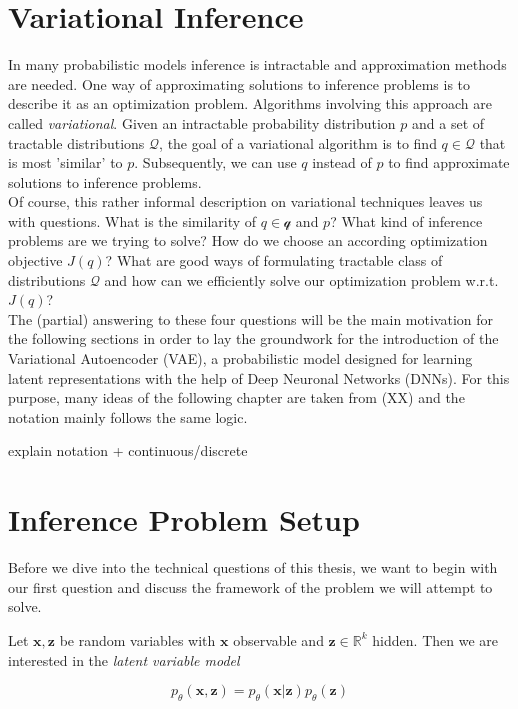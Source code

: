 


\section{Variational Inference}

In many probabilistic models inference is intractable and approximation methods are needed. One way of approximating solutions to inference problems is to describe it as an optimization problem. Algorithms involving this approach are called \emph{variational}.
Given an intractable probability distribution $p$ and a set of tractable distributions $\mathcal{Q}$, the goal of a variational algorithm is to find $q \in \mathcal{Q}$ that is most 'similar' to $p$. Subsequently, we can use $q$ instead of $p$ to find approximate solutions to inference problems.\\
Of course, this rather informal description on variational techniques leaves us with questions. What is the similarity of $q \in \mathcal{q}$ and $p$? What kind of inference problems are we trying to solve? How do we choose an according optimization objective $J(q)$? What are good ways of formulating tractable class of distributions $\mathcal{Q}$ and how can we efficiently solve our optimization problem w.r.t. $J(q)$? \\
The (partial) answering to these four questions will be the main motivation for the following sections in order to lay the groundwork for the introduction of the Variational Autoencoder (VAE), a probabilistic model designed for learning latent representations with the help of Deep Neuronal Networks (DNNs). For this purpose, many ideas of the following chapter are taken from (XX) and the notation mainly follows the same logic. %

explain notation + continuous/discrete

\section{Inference Problem Setup}
Before we dive into the technical questions of this thesis, we want to begin with our first question and discuss the framework of the problem we will attempt to solve. 

Let $\mathbf{x}, \mathbf{z}$ be random variables with $\mathbf{x}$ observable and $\mathbf{z} \in \mathbb{R}^k$ hidden. Then we are interested in the \textit{latent variable model}

\begin{equation}
	p_{\theta}(\mathbf{x}, \mathbf{z}) = p_{\theta}(\mathbf{x}| \mathbf{z})p_{\theta}(\mathbf{z})
\end{equation}


